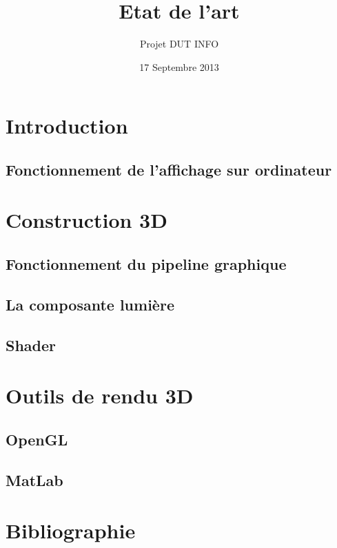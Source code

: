 \documentclass[12pt,a4paper,openany]{report}
\title{Etat de l'art}
\author{Projet DUT INFO}
\date{17 Septembre 2013}
\begin{document}
\maketitle

\hypertarget{tableofcontents}{} %
\tableofcontents

\part{Introduction}

\chapter{Fonctionnement de l'affichage sur ordinateur}


\part{Construction 3D}
\chapter{Fonctionnement du pipeline graphique}


\chapter{La composante lumière}


\chapter{Shader}


\part{Outils de rendu 3D}

\chapter{OpenGL}


\chapter{MatLab}



\part{Bibliographie}

\end{document}
